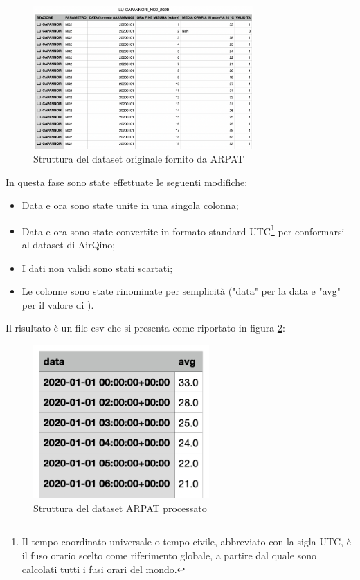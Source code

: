 \begin{figure}[H]
\centering
\captionsetup{justification=centering}
\includegraphics[width=0.75\textwidth,height=\textheight,keepaspectratio]{img/dataset_arpat_no2_prima.png}
\caption{Struttura del dataset originale  fornito da ARPAT}
\label{fig:ds-arpat}
\end{figure}

In questa fase sono state effettuate le seguenti modifiche:
\begin{itemize}
  \item Data e ora sono state unite in una singola colonna;
  \item Data e ora sono state convertite in formato standard UTC\footnote{Il tempo coordinato universale o tempo civile, abbreviato con la sigla UTC, è il fuso orario scelto come riferimento globale, a partire dal quale sono calcolati tutti i fusi orari del mondo.} per conformarsi al dataset di AirQino;
  \item I dati non validi sono stati scartati;
  \item Le colonne sono state rinominate per semplicità ("data" per la data e "avg" per il valore di ).
\end{itemize}

Il risultato è un file csv che si presenta come riportato in figura \ref{fig:ds-arpat-dopo}:

\begin{figure}[H]
\centering
\captionsetup{justification=centering}
\includegraphics[width=0.60\textwidth,height=\textheight,keepaspectratio]{img/dataset_arpat_no2_dopo.png}
\caption{Struttura del dataset ARPAT  processato}
\label{fig:ds-arpat-dopo}
\end{figure}

